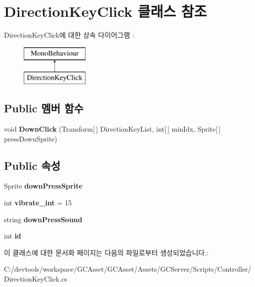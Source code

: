 \hypertarget{class_direction_key_click}{}\section{Direction\+Key\+Click 클래스 참조}
\label{class_direction_key_click}
Direction\+Key\+Click에 대한 상속 다이어그램 \+: \begin{figure}[H]
\begin{center}
\leavevmode
\includegraphics[height=2.000000cm]{class_direction_key_click}
\end{center}
\end{figure}
\subsection*{Public 멤버 함수}
\begin{DoxyCompactItemize}
\item 
\hypertarget{class_direction_key_click_adeaf3aba6816d125c2bdd1c0fbb92e19}{}void {\bfseries Down\+Click} (Transform\mbox{[}$\,$\mbox{]} Direction\+Key\+List, int\mbox{[}$\,$\mbox{]} min\+Idx, Sprite\mbox{[}$\,$\mbox{]} press\+Down\+Sprite)\label{class_direction_key_click_adeaf3aba6816d125c2bdd1c0fbb92e19}

\end{DoxyCompactItemize}
\subsection*{Public 속성}
\begin{DoxyCompactItemize}
\item 
\hypertarget{class_direction_key_click_a787c7dfe720ee86d820011371bc83e2f}{}Sprite {\bfseries down\+Press\+Sprite}\label{class_direction_key_click_a787c7dfe720ee86d820011371bc83e2f}

\item 
\hypertarget{class_direction_key_click_ade1220b81a0de4ca8a8d61bca87deb74}{}int {\bfseries vibrate\+\_\+int} = 15\label{class_direction_key_click_ade1220b81a0de4ca8a8d61bca87deb74}

\item 
\hypertarget{class_direction_key_click_a404f6b7b957ce75421ebcbf93bbc60b2}{}string {\bfseries down\+Press\+Sound}\label{class_direction_key_click_a404f6b7b957ce75421ebcbf93bbc60b2}

\item 
\hypertarget{class_direction_key_click_a3924c20fb7c7f1e60908e992cebf9248}{}int {\bfseries id}\label{class_direction_key_click_a3924c20fb7c7f1e60908e992cebf9248}

\end{DoxyCompactItemize}


이 클래스에 대한 문서화 페이지는 다음의 파일로부터 생성되었습니다.\+:\begin{DoxyCompactItemize}
\item 
C\+:/devtools/workspace/\+G\+C\+Asset/\+G\+C\+Asset/\+Assets/\+G\+C\+Server/\+Scripts/\+Controller/Direction\+Key\+Click.\+cs\end{DoxyCompactItemize}
